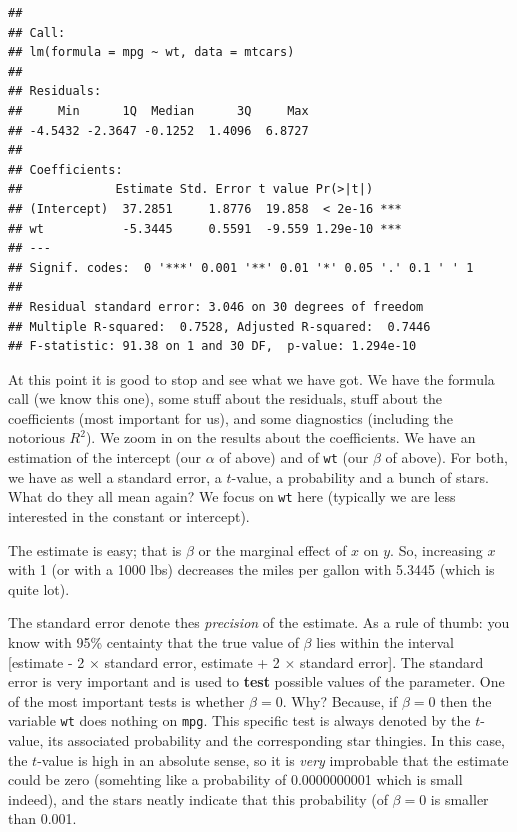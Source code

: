 \documentclass[]{article}
\begin{document}
\begin{verbatim}
## 
## Call:
## lm(formula = mpg ~ wt, data = mtcars)
## 
## Residuals:
##     Min      1Q  Median      3Q     Max 
## -4.5432 -2.3647 -0.1252  1.4096  6.8727 
## 
## Coefficients:
##             Estimate Std. Error t value Pr(>|t|)    
## (Intercept)  37.2851     1.8776  19.858  < 2e-16 ***
## wt           -5.3445     0.5591  -9.559 1.29e-10 ***
## ---
## Signif. codes:  0 '***' 0.001 '**' 0.01 '*' 0.05 '.' 0.1 ' ' 1
## 
## Residual standard error: 3.046 on 30 degrees of freedom
## Multiple R-squared:  0.7528, Adjusted R-squared:  0.7446 
## F-statistic: 91.38 on 1 and 30 DF,  p-value: 1.294e-10
\end{verbatim}

At this point it is good to stop and see what we have got. We have the
formula call (we know this one), some stuff about the residuals, stuff
about the coefficients (most important for us), and some diagnostics
(including the notorious \(R^2\)). We zoom in on the results about the
coefficients. We have an estimation of the intercept (our \(\alpha\) of
above) and of \texttt{wt} (our \(\beta\) of above). For both, we have as
well a standard error, a \(t\)-value, a probability and a bunch of
stars. What do they all mean again? We focus on \texttt{wt} here
(typically we are less interested in the constant or intercept).

The estimate is easy; that is \(\beta\) or the marginal effect of \(x\)
on \(y\). So, increasing \(x\) with 1 (or with a 1000 lbs) decreases the
miles per gallon with 5.3445 (which is quite lot).

The standard error denote thes \emph{precision} of the estimate. As a
rule of thumb: you know with 95\% centainty that the true value of
\(\beta\) lies within the interval {[}estimate - 2 \(\times\) standard
error, estimate + 2 \(\times\) standard error{]}. The standard error is
very important and is used to \textbf{test} possible values of the
parameter. One of the most important tests is whether \(\beta=0\). Why?
Because, if \(\beta=0\) then the variable \texttt{wt} does nothing on
\texttt{mpg}. This specific test is always denoted by the \(t\)-value,
its associated probability and the corresponding star thingies. In this
case, the \(t\)-value is high in an absolute sense, so it is \emph{very}
improbable that the estimate could be zero (somehting like a probability
of 0.0000000001 which is small indeed), and the stars neatly indicate
that this probability (of \(\beta=0\) is smaller than 0.001.
\end{document}
